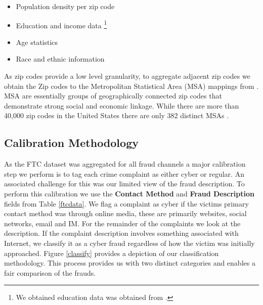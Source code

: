 \documentclass[conference]{IEEEtran}
\begin{document}
\begin{itemize}
\vspace{8pt}
  \item Population density per zip code
  \item Education and income data \footnote{We obtained education data was obtained from \cite{zipatlas}.}
  \item Age statistics
  \item Race and ethnic information
  \vspace{8pt}
\end{itemize}

As zip codes provide a low level granularity, to aggregate adjacent zip codes we obtain the Zip codes to the Metropolitan Statistical Area (MSA) mappings from \cite{uslaborstats}. MSA are essentially groups of geographically connected zip codes that demonstrate strong social and economic linkage. While there are more than 40,000 zip codes in the United States there are only 382 distinct MSAs \cite{uscensus}.

\subsection{Calibration Methodology}

As the FTC dataset was aggregated for all fraud channels a major calibration step we perform is to tag each crime complaint as either cyber or regular. An associated challenge for this was our limited view of the fraud description. To perform this calibration we use the \textbf{Contact Method} and \textbf{Fraud Description} fields from Table \ref{ftcdata}. We flag a complaint as cyber if the victims primary contact method was through online media, these are primarily websites, social networks, email and IM. For the remainder of the complaints we look at the description. If the complaint description involves something associated with Internet, we classify it as a cyber fraud regardless of how the victim was initially approached. Figure \ref{classify} provides a depiction of our classification methodology. This process  provides us with two distinct categories  and enables a fair comparison of the frauds. 
     
\end{document}
